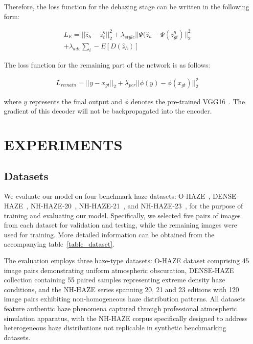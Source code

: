 \documentclass[journal]{IEEEtran}
\begin{document}
Therefore, the loss function for the dehazing stage can be written in the following form:

\begin{equation}
	\label{encoder_loss}
	\begin{split}
		L_{E} =||\widehat{z}_{h} - z^{q}_{t} ||_{2}^{2} + \lambda_{style} ||\Psi(\widehat{z}_{h} - \Psi(z^{q}_{gt}) ||_{2}^{2} \\
		+ \lambda_{adv}\sum_{i} -E[D(\widehat{z}_{h})]
	\end{split}
\end{equation}

The loss function for the remaining part of the network is as follows:

\begin{equation}
	\label{rest_loss}
	\begin{split}
		L_{remain} =||y - x_{gt} ||_{2} + \lambda_{per} ||\phi(y) - \phi(x_{gt}) ||_{2}^{2}
	\end{split}
\end{equation}

\noindent where $y$ represents the final output and $\phi$ denotes the pre-trained VGG16~\cite{simonyan2014very}. The gradient of this decoder will not be backpropagated into the encoder.


\section{EXPERIMENTS}

\subsection{Datasets}
We evaluate our model on four benchmark haze datasets: O-HAZE~\cite{ancuti2018ohaze}, DENSE-HAZE~\cite{ancuti2019dense}, NH-HAZE-20~\cite{ancuti2020ntire}, NH-HAZE-21~\cite{ancuti2021ntire}, and NH-HAZE-23~\cite{ancuti2023ntire}, for the purpose of training and evaluating our model. Specifically, we selected five pairs of images from each dataset for validation and testing, while the remaining images were used for training. More detailed information can be obtained from the accompanying table~\ref{table_dataset}.

The evaluation employs three haze-type datasets: O-HAZE dataset comprising 45 image pairs demonstrating uniform atmospheric obscuration, DENSE-HAZE collection containing 55 paired samples representing extreme density haze conditions, and the NH-HAZE series spanning 20, 21 and 23 editions with 120 image pairs exhibiting non-homogeneous haze distribution patterns. All datasets feature authentic haze phenomena captured through professional atmospheric simulation apparatus, with the NH-HAZE corpus specifically designed to address heterogeneous haze distributions not replicable in synthetic benchmarking datasets.
\end{document}
